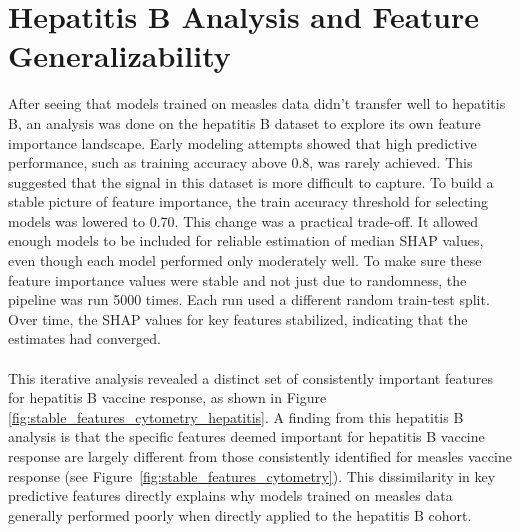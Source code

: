 \documentclass[12pt,a4paper]{report}
\begin{document}
\section{Hepatitis B Analysis and Feature Generalizability}
\noindent
After seeing that models trained on measles data didn’t transfer well to hepatitis B, an analysis was done on the hepatitis B dataset to explore its own feature importance landscape. Early modeling attempts showed that high predictive performance, such as training accuracy above 0.8, was rarely achieved. This suggested that the signal in this dataset is more difficult to capture. To build a stable picture of feature importance, the train accuracy threshold for selecting models was lowered to 0.70. This change was a practical trade-off. It allowed enough models to be included for reliable estimation of median SHAP values, even though each model performed only moderately well. To make sure these feature importance values were stable and not just due to randomness, the pipeline was run 5000 times. Each run used a different random train-test split. Over time, the SHAP values for key features stabilized, indicating that the estimates had converged.\\
\\
This iterative analysis revealed a distinct set of consistently important features for hepatitis B vaccine response, as shown in Figure \ref{fig:stable_features_cytometry_hepatitis}. A finding from this hepatitis B analysis is that the specific features deemed important for hepatitis B vaccine response are largely different from those consistently identified for measles vaccine response (see Figure~\ref{fig:stable_features_cytometry}). This dissimilarity in key predictive features directly explains why models trained on measles data generally performed poorly when directly applied to the hepatitis B cohort.
\end{document}
